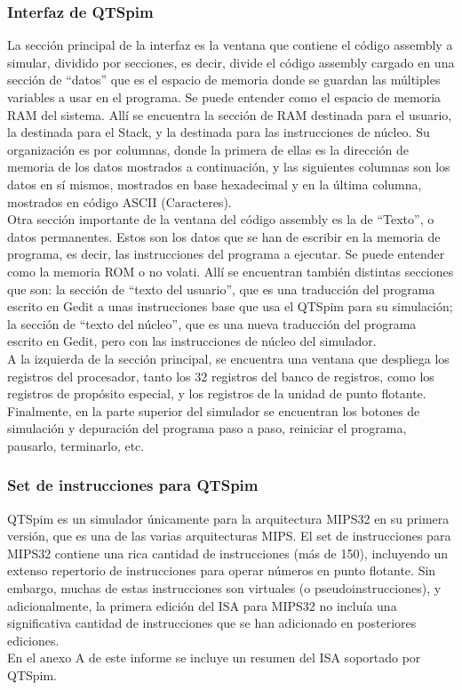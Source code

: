 \documentclass[twocolumn]{IEEEtran}
\begin{document}
\subsubsection{Interfaz de QTSpim}
\noindent
La sección principal de la interfaz es la ventana que contiene el código assembly a simular, dividido por secciones, es decir, divide el código assembly cargado en una sección de “datos” que es el espacio de memoria donde se guardan las múltiples variables a usar en el programa. Se puede entender como el espacio de memoria RAM del sistema. Allí se encuentra la sección de RAM destinada para el usuario, la destinada para el Stack, y la destinada para las instrucciones de núcleo. Su organización es por columnas, donde la primera de ellas es la dirección de memoria de los datos mostrados a continuación, y las siguientes columnas son los datos en sí mismos, mostrados en base hexadecimal y en la última columna, mostrados en código ASCII (Caracteres). \\
Otra sección importante de la ventana del código assembly es la de “Texto”, o datos permanentes. Estos son los datos que se han de escribir en la memoria de programa, es decir, las instrucciones del programa a ejecutar. Se puede entender como la memoria ROM o no ­volati. Allí se encuentran también distintas secciones que son: la sección de “texto del usuario”, que es una traducción del programa escrito en Gedit a unas instrucciones base que usa el QTSpim para su simulación; la sección de “texto del núcleo”, que es una nueva traducción del programa escrito en Gedit, pero con las instrucciones de núcleo del simulador.\\
A la izquierda de la sección principal, se encuentra una ventana que despliega los registros del procesador, tanto los 32 registros del banco de registros, como los registros de propósito especial, y los registros de la unidad de punto flotante.\\
Finalmente, en la parte superior del simulador se encuentran los botones de simulación y depuración del programa paso a paso, reiniciar el programa, pausarlo, terminarlo, etc.

\subsubsection{Set de instrucciones para QTSpim}
\noindent
QTSpim es un simulador únicamente para la arquitectura MIPS32 en su primera versión, que es una de las varias arquitecturas MIPS. El set de instrucciones para MIPS32 contiene una rica cantidad de instrucciones (más de 150), incluyendo un extenso repertorio de instrucciones para operar números en punto flotante. Sin embargo, muchas de estas instrucciones son virtuales (o pseudoinstrucciones), y adicionalmente, la primera edición del ISA para MIPS32 no incluía una significativa cantidad de instrucciones que se han adicionado en posteriores ediciones.\\
En el anexo A de este informe se incluye un resumen del ISA soportado por QTSpim.
\end{document}
